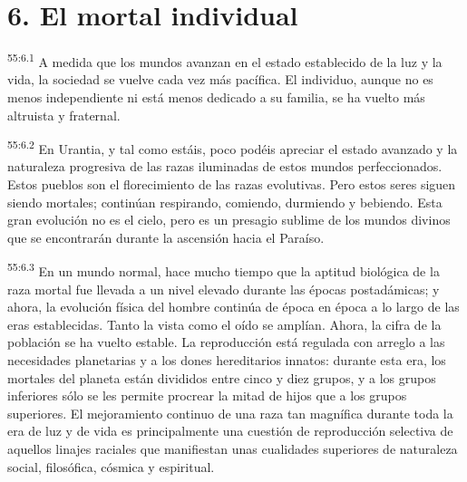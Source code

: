\section*{6. El mortal individual}
\par
\textsuperscript{55:6.1} A medida que los mundos avanzan en el estado establecido de la luz y la vida, la sociedad se vuelve cada vez más pacífica. El individuo, aunque no es menos independiente ni está menos dedicado a su familia, se ha vuelto más altruista y fraternal.

\par
\textsuperscript{55:6.2} En Urantia, y tal como estáis, poco podéis apreciar el estado avanzado y la naturaleza progresiva de las razas iluminadas de estos mundos perfeccionados. Estos pueblos son el florecimiento de las razas evolutivas. Pero estos seres siguen siendo mortales; continúan respirando, comiendo, durmiendo y bebiendo. Esta gran evolución no es el cielo, pero es un presagio sublime de los mundos divinos que se encontrarán durante la ascensión hacia el Paraíso.

\par
\textsuperscript{55:6.3} En un mundo normal, hace mucho tiempo que la aptitud biológica de la raza mortal fue llevada a un nivel elevado durante las épocas postadámicas; y ahora, la evolución física del hombre continúa de época en época a lo largo de las eras establecidas. Tanto la vista como el oído se amplían. Ahora, la cifra de la población se ha vuelto estable. La reproducción está regulada con arreglo a las necesidades planetarias y a los dones hereditarios innatos: durante esta era, los mortales del planeta están divididos entre cinco y diez grupos, y a los grupos inferiores sólo se les permite procrear la mitad de hijos que a los grupos superiores. El mejoramiento continuo de una raza tan magnífica durante toda la era de luz y de vida es principalmente una cuestión de reproducción selectiva de aquellos linajes raciales que manifiestan unas cualidades superiores de naturaleza social, filosófica, cósmica y espiritual.


